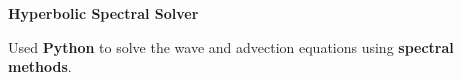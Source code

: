 \textbf{Hyperbolic Spectral Solver} \hfill {}

	\begin{items}
		\item Used \textbf{Python} to solve the wave and advection equations using \textbf{spectral methods}.
	\end{items}